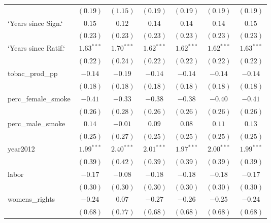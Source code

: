 \begin{table}[!h]
\begin{center}
\begin{tabular}{l c c c c c c }
                        & $(0.19)$     & $(1.15)$     & $(0.19)$     & $(0.19)$     & $(0.19)$     & $(0.19)$     \\
`Years since Sign.`     & $0.15$       & $0.12$       & $0.14$       & $0.14$       & $0.14$       & $0.15$       \\
                        & $(0.23)$     & $(0.23)$     & $(0.23)$     & $(0.23)$     & $(0.23)$     & $(0.23)$     \\
`Years since Ratif.`    & $1.63^{***}$ & $1.70^{***}$ & $1.62^{***}$ & $1.62^{***}$ & $1.62^{***}$ & $1.63^{***}$ \\
                        & $(0.22)$     & $(0.24)$     & $(0.22)$     & $(0.22)$     & $(0.22)$     & $(0.22)$     \\
tobac\_prod\_pp         & $-0.14$      & $-0.19$      & $-0.14$      & $-0.14$      & $-0.14$      & $-0.14$      \\
                        & $(0.18)$     & $(0.18)$     & $(0.18)$     & $(0.18)$     & $(0.18)$     & $(0.18)$     \\
perc\_female\_smoke     & $-0.41$      & $-0.33$      & $-0.38$      & $-0.38$      & $-0.40$      & $-0.41$      \\
                        & $(0.26)$     & $(0.28)$     & $(0.26)$     & $(0.26)$     & $(0.26)$     & $(0.26)$     \\
perc\_male\_smoke       & $0.14$       & $-0.01$      & $0.09$       & $0.08$       & $0.11$       & $0.13$       \\
                        & $(0.25)$     & $(0.27)$     & $(0.25)$     & $(0.25)$     & $(0.25)$     & $(0.25)$     \\
year2012                & $1.99^{***}$ & $2.40^{***}$ & $2.01^{***}$ & $1.97^{***}$ & $2.00^{***}$ & $1.99^{***}$ \\
                        & $(0.39)$     & $(0.42)$     & $(0.39)$     & $(0.39)$     & $(0.39)$     & $(0.39)$     \\
labor                   & $-0.17$      & $-0.08$      & $-0.18$      & $-0.18$      & $-0.18$      & $-0.17$      \\
                        & $(0.30)$     & $(0.30)$     & $(0.30)$     & $(0.30)$     & $(0.30)$     & $(0.30)$     \\
womens\_rights          & $-0.24$      & $0.07$       & $-0.27$      & $-0.26$      & $-0.25$      & $-0.24$      \\
                        & $(0.68)$     & $(0.77)$     & $(0.68)$     & $(0.68)$     & $(0.68)$     & $(0.68)$     \\

\end{tabular}
\end{center}
\end{table}
